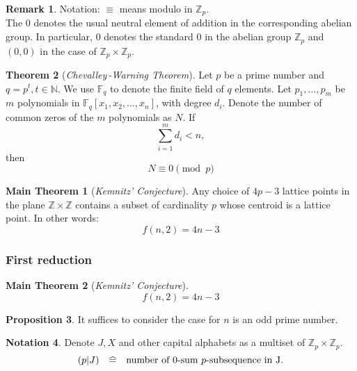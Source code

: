 \documentclass[notheorems, envcountsect]{beamer}
\theoremstyle{definition}
\newtheorem{theorem}{Theorem}[section]
\newtheorem{mainTheorem}{Main Theorem}
\newtheorem{proposition}[theorem]{Proposition}
\newtheorem{remark}[theorem]{Remark}
\theoremstyle{definition}
\newtheorem{notation}[theorem]{Notation}
\numberwithin{equation}{theorem}
\numberwithin{figure}{theorem}
\newcommand\reallywidehat[1]{%
\savestack{\tmpbox}{\stretchto{%
  \scaleto{%
    \scalerel*[\widthof{\ensuremath{#1}}]{\kern-.6pt\bigwedge\kern-.6pt}%
    {\rule[-\textheight/2]{1ex}{\textheight}}%
  }{\textheight}%
}{0.5ex}}%
\stackon[1pt]{#1}{\tmpbox}%
}
\newcommand{\warningTheorem}{\emph{Chevalley\,-Warning Theorem}}
\newcommand{\kemnitzConjecture}{\emph{Kemnitz' Conjecture}}
\newcommand{\Field}[1]{\ensuremath{\mathbb{F}_{#1}}}
\newcommand{\IntegerP}[1]{\ensuremath{\mathbb{Z}_{#1}}}
\newcommand{\NaturalNumber}{\ensuremath{\mathbb{N}}}
\newcommand{\Integer}{\ensuremath{\mathbb{Z}}}
\newcommand{\PolynomialRing}[2]{\ensuremath{#1[x_1,x_2,\ldots,x_{#2}]}}
\newcommand{\zeroSumSeq}[1]{$0$-sum $#1$-subsequence}
\newcommand{\means}{\ensuremath{\reallywidehat{=}}}
\newcommand{\fnd}[2]{\ensuremath{f(#1,#2)}}
\newcommand{\numSumSubset}[2]{\ensuremath{(#1|#2)}}
\begin{document}
\begin{frame}
    \begin{remark}
        Notation: $\equiv$ means modulo in $\IntegerP{p}$.\\
        The $0$ denotes the usual neutral element of addition in the corresponding abelian group. In particular,
        $0$ denotes the standard $0$ in the abelian group $\IntegerP{p}$ and $(0,0)$ in the case of $\IntegerP{p}\times \IntegerP{p}$.
    \end{remark}
    \pause
    \begin{theorem}[\warningTheorem]\label{theorem:warning}
        Let $p$ be a prime number and $q = p^t, t \in \NaturalNumber$. We use $\Field{q}$ to denote the finite field of $q$ elements.
        Let $p_1,\ldots,p_m$ be $m$ polynomials in $\PolynomialRing{\Field{q}}{n}$, with degree $d_i$. Denote the number of common
        zeros of the $m$ polynomials as $N$.
        If 
        \[\sum_{i = 1}^{m} d_i < n,\]
        then 
        \[N \equiv 0 \pmod{p}\]
    \end{theorem}    
\end{frame}

\begin{frame}
    \begin{mainTheorem}[\kemnitzConjecture{}]
        Any choice of $4p-3$ lattice points in the plane $\Integer \times \Integer$ contains
        a subset of cardinality $p$ whose centroid is a lattice point. In other words:
        \[\fnd{n}{2} = 4n - 3\]
    \end{mainTheorem}
\end{frame}

\begin{frame}
    \frametitle{First reduction}
    \begin{mainTheorem}[\kemnitzConjecture{}]
     \[\fnd{n}{2} = 4n - 3\]
    \end{mainTheorem}
    \begin{proposition}
        It suffices to consider the case for $n$ is an odd prime number.
    \end{proposition}
    \pause
    \begin{notation}
        Denote $J,X$ and other capital alphabets
        as a multiset of $\IntegerP{p} \times \IntegerP{p}$.\\
            \[
                \numSumSubset{p}{J} \quad \means{} \quad \text{number of \zeroSumSeq{p} in J}.
            \]
    \end{notation}
\end{frame}
\end{document}
